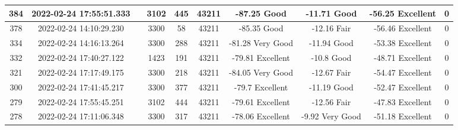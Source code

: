 \begin{longtable*}{|c|c|c|c|c|c|c|c|c|c|}
384&2022-02-24 17:55:51.333&&3102&445&43211& -87.25    Good        & -11.71    Good        & -56.25    Excellent   & 0\\\hline
{}378&2022-02-24 14:10:29.230&&3300&58&43211& -85.35    Good        & -12.16    Fair        & -56.46    Excellent   & 0\\\hline
{}334&2022-02-24 14:16:13.264&&3300&288&43211& -81.28    Very Good   & -11.94    Good        & -53.38    Excellent   & 0\\\hline
{}332&2022-02-24 17:40:27.122&&1423&191&43211& -79.81    Excellent   & -10.8     Good        & -48.71    Excellent   & 0\\\hline
{}321&2022-02-24 17:17:49.175&&3300&218&43211& -84.05    Very Good   & -12.67    Fair        & -54.47    Excellent   & 0\\\hline
{}300&2022-02-24 17:41:45.217&&3300&377&43211& -79.7     Excellent   & -11.19    Good        & -52.47    Excellent   & 0\\\hline
{}279&2022-02-24 17:55:45.251&&3102&444&43211& -79.61    Excellent   & -12.56    Fair        & -47.83    Excellent   & 0\\\hline
{}278&2022-02-24 17:11:06.348&&3300&317&43211& -78.06    Excellent   & -9.92     Very Good   & -51.18    Excellent   & 0\\\hline

\end{longtable*}

